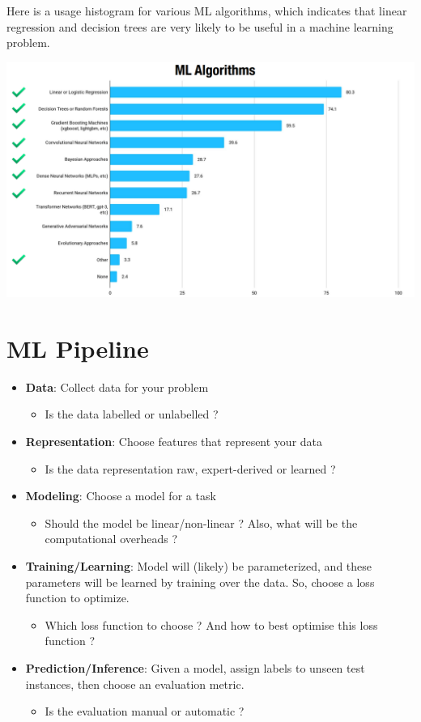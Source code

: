 \documentclass{report}
\begin{document}
Here is a usage histogram for various ML algorithms, which indicates that linear regression and decision trees are very likely to be useful in a machine learning problem.

\begin{center}
  \includegraphics[scale=0.2]{"images/02.png"}
\end{center}

\section{ML Pipeline}
\begin{itemize}
  \item \textbf{Data}: Collect data for your problem
        \begin{itemize}
          \item Is the data labelled or unlabelled ?
        \end{itemize}
  \item \textbf{Representation}: Choose features that represent your data
        \begin{itemize}
          \item Is the data representation raw, expert-derived or learned ?
        \end{itemize}
  \item \textbf{Modeling}: Choose a model for a task
        \begin{itemize}
          \item Should the model be linear/non-linear ? Also, what will be the computational overheads ?
        \end{itemize}
  \item \textbf{Training/Learning}: Model will (likely) be parameterized, and these parameters will be learned by training over the data. So, choose a loss function to optimize.
        \begin{itemize}
          \item Which loss function to choose ? And how to best optimise this loss function ?
        \end{itemize}
  \item \textbf{Prediction/Inference}: Given a model, assign labels to unseen test instances, then choose an evaluation metric.
        \begin{itemize}
          \item Is the evaluation manual or automatic ?
        \end{itemize}
\end{itemize}
\end{document}
